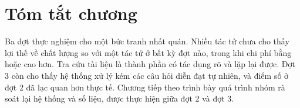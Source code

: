 \section{Tóm tắt chương}

Ba đợt thực nghiệm cho một bức tranh nhất quán. Nhiều tác tử chưa cho thấy lợi thế về chất lượng so với một tác tử ở bất kỳ đợt nào, trong khi chi phí bằng hoặc cao hơn. Tra cứu tài liệu là thành phần có tác dụng rõ và lặp lại được. Đợt 3 còn cho thấy hệ thống xử lý kém các câu hỏi diễn đạt tự nhiên, và điểm số ở đợt 2 đã lạc quan hơn thực tế. Chương tiếp theo trình bày quá trình nhóm rà soát lại hệ thống và số liệu, được thực hiện giữa đợt 2 và đợt 3.
